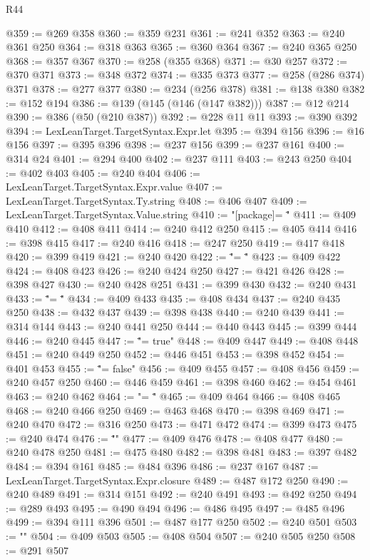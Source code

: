 \begin{lexlean}{R44}
\begin{coremodule}
@359 := @269 @358
@360 := @359 @231
@361 := @241 @352
@363 := @240 @361 @250
@364 := @318 @363
@365 := @360 @364
@367 := @240 @365 @250
@368 := @357 @367
@370 := @258 (@355 @368)
@371 := @30 @257
@372 := @370 @371
@373 := @348 @372
@374 := @335 @373
@377 := @258 (@286 @374) @371
@378 := @277 @377
@380 := @234 (@256 @378)
@381 := @138 @380
@382 := @152 @194
@386 := @139 (@145 (@146 (@147 @382)))
@387 := @12 @214
@390 := @386 (@50 (@210 @387))
@392 := @228 @11 @11
@393 := @390 @392
@394 := LexLeanTarget.TargetSyntax.Expr.let
@395 := @394 @156
@396 := @16 @156
@397 := @395 @396
@398 := @237 @156
@399 := @237 @161
@400 := @314 @24
@401 := @294 @400
@402 := @237 @111
@403 := @243 @250
@404 := @402 @403
@405 := @240 @404
@406 := LexLeanTarget.TargetSyntax.Expr.value
@407 := LexLeanTarget.TargetSyntax.Ty.string
@408 := @406 @407
@409 := LexLeanTarget.TargetSyntax.Value.string
@410 := "[package]\nname = \""
@411 := @409 @410
@412 := @408 @411
@414 := @240 @412 @250
@415 := @405 @414
@416 := @398 @415
@417 := @240 @416
@418 := @247 @250
@419 := @417 @418
@420 := @399 @419
@421 := @240 @420
@422 := "\"\nversion = \""
@423 := @409 @422
@424 := @408 @423
@426 := @240 @424 @250
@427 := @421 @426
@428 := @398 @427
@430 := @240 @428 @251
@431 := @399 @430
@432 := @240 @431
@433 := "\"\nedition = \""
@434 := @409 @433
@435 := @408 @434
@437 := @240 @435 @250
@438 := @432 @437
@439 := @398 @438
@440 := @240 @439
@441 := @314 @144
@443 := @240 @441 @250
@444 := @440 @443
@445 := @399 @444
@446 := @240 @445
@447 := "\"\npublish = true"
@448 := @409 @447
@449 := @408 @448
@451 := @240 @449 @250
@452 := @446 @451
@453 := @398 @452
@454 := @401 @453
@455 := "\"\npublish = false"
@456 := @409 @455
@457 := @408 @456
@459 := @240 @457 @250
@460 := @446 @459
@461 := @398 @460
@462 := @454 @461
@463 := @240 @462
@464 := "\n\n[lib]\npath = \""
@465 := @409 @464
@466 := @408 @465
@468 := @240 @466 @250
@469 := @463 @468
@470 := @398 @469
@471 := @240 @470
@472 := @316 @250
@473 := @471 @472
@474 := @399 @473
@475 := @240 @474
@476 := "\"\n{}\n"
@477 := @409 @476
@478 := @408 @477
@480 := @240 @478 @250
@481 := @475 @480
@482 := @398 @481
@483 := @397 @482
@484 := @394 @161
@485 := @484 @396
@486 := @237 @167
@487 := LexLeanTarget.TargetSyntax.Expr.closure
@489 := @487 @172 @250
@490 := @240 @489
@491 := @314 @151
@492 := @240 @491
@493 := @492 @250
@494 := @289 @493
@495 := @490 @494
@496 := @486 @495
@497 := @485 @496
@499 := @394 @111 @396
@501 := @487 @177 @250
@502 := @240 @501
@503 := "\n"
@504 := @409 @503
@505 := @408 @504
@507 := @240 @505 @250
@508 := @291 @507

\end{coremodule}
\end{lexlean}
